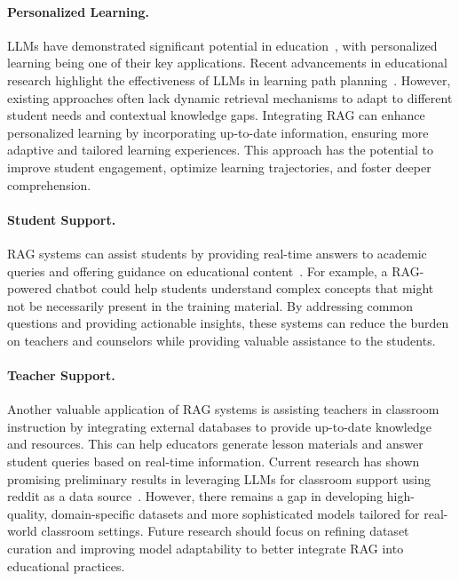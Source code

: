 \paragraph{Personalized Learning.}
LLMs have demonstrated significant potential in education~\cite{wang2024largelanguagemodelseducation}, with personalized learning being one of their key applications. Recent advancements in educational research highlight the effectiveness of LLMs in learning path planning~\cite{ng2024educationalpersonalizedlearningpath}. However, existing approaches often lack dynamic retrieval mechanisms to adapt to different student needs and contextual knowledge gaps. Integrating RAG can enhance personalized learning by incorporating up-to-date information, ensuring more adaptive and tailored learning experiences. This approach has the potential to improve student engagement, optimize learning trajectories, and foster deeper comprehension.

\paragraph{Student Support.}
RAG systems can assist students by providing real-time answers to academic queries and offering guidance on educational content~\cite{wang2024largelanguagemodelseducation, dakshit2024facultyperspectivespotentialrag}. For example, a RAG-powered chatbot could help students understand complex concepts that might not be necessarily present in the training material. By addressing common questions and providing actionable insights, these systems can reduce the burden on teachers and counselors while providing valuable assistance to the students. 

\paragraph{Teacher Support.}
Another valuable application of RAG systems is assisting teachers in classroom instruction by integrating external databases to provide up-to-date knowledge and resources. This can help educators generate lesson materials and answer student queries based on real-time information. Current research has shown promising preliminary results in leveraging LLMs for classroom support using reddit as a data source~\cite{mullins2024enhancingclassroomteachingllms}. However, there remains a gap in developing high-quality, domain-specific datasets and more sophisticated models tailored for real-world classroom settings. Future research should focus on refining dataset curation and improving model adaptability to better integrate RAG into educational practices.

